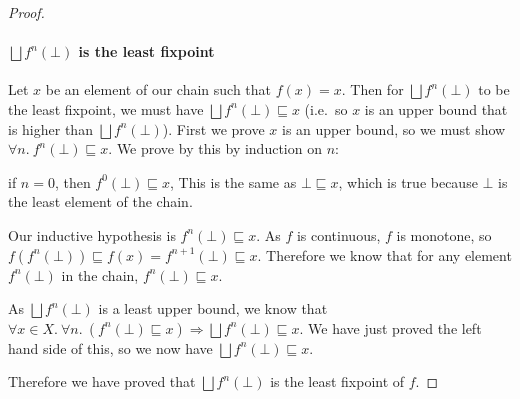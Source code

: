 \begin{proof}
\paragraph{$\bigsqcup f^n (\bot)$ is the least fixpoint}
Let $x$ be an element of our chain such that $f(x) = x$. Then for $\bigsqcup f^n (\bot)$ to be the least fixpoint, we must have $\bigsqcup f^n (\bot) \sqsubseteq x$ (i.e.\ so $x$ is an upper bound that is higher than $\bigsqcup f^n (\bot)$). First we prove $x$ is an upper bound, so  we must show $\forall n. \ f^n(\bot) \sqsubseteq x$. We prove by this by induction on $n$:

if $n = 0$, then $f^0(\bot) \sqsubseteq x$, This is the same as $\bot \sqsubseteq x$, which is true because $\bot$ is the least element of the chain.

Our inductive hypothesis is $f^n(\bot) \sqsubseteq x$. As $f$ is continuous, $f$ is monotone, so $f(f^n(\bot)) \sqsubseteq f(x) = f^{n+1}(\bot) \sqsubseteq x$. Therefore we know that for any element $f^n(\bot)$ in the chain, $f^n(\bot) \sqsubseteq x$. 

As $\bigsqcup f^n (\bot)$ is a least upper bound, we know that  $\forall x \in X. \  \forall n. \ (f^n(\bot) \sqsubseteq x) \Rightarrow \bigsqcup f^n (\bot) \sqsubseteq x$. We have just proved the left hand side of this, so we now have $\bigsqcup f^n (\bot) \sqsubseteq x$.

Therefore we have proved that $\bigsqcup f^n (\bot)$ is the least fixpoint of $f$.
\end{proof}
